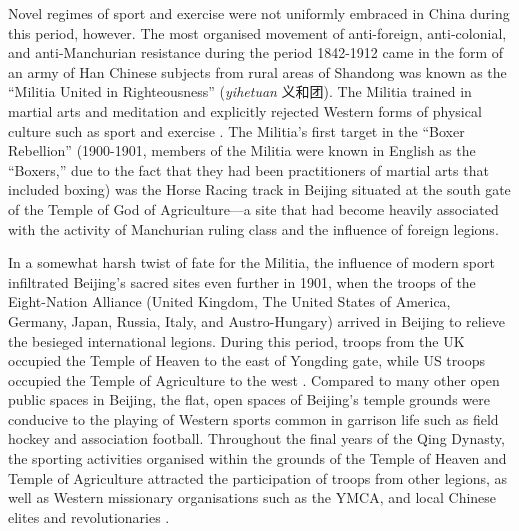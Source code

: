 \begin{CJK}{UTF8}{gbsn}
Novel regimes of sport and exercise were not uniformly embraced in China during this period, however.  The most organised movement of anti-foreign, anti-colonial, and anti-Manchurian resistance during the period 1842-1912 came in the form of an army of Han Chinese subjects from rural areas of Shandong was known as the ``Militia United in Righteousness'' (\textit{yihetuan} 义和团).  The Militia trained in martial arts and meditation and explicitly rejected Western forms of physical culture such as sport and exercise \citep{Brownell2008}.  The Militia's first target in the ``Boxer Rebellion'' (1900-1901, members of the Militia were known in English as the ``Boxers,'' due to the fact that they had been practitioners of martial arts that included boxing) was the Horse Racing track in Beijing situated at the south gate of the Temple of God of Agriculture---a site that had become heavily associated with the activity of Manchurian ruling class and the influence of foreign legions.

In a somewhat harsh twist of fate for the Militia, the influence of modern sport infiltrated Beijing's sacred sites even further in 1901, when the troops of the Eight-Nation Alliance (United Kingdom, The United States of America, Germany, Japan, Russia, Italy, and Austro-Hungary) arrived in Beijing to relieve the besieged international legions.  During this period, troops from the UK occupied the Temple of Heaven to the east of Yongding gate, while US troops occupied the Temple of Agriculture to the west \citep{Brownell2008}. Compared to many other open public spaces in Beijing, the flat, open spaces of Beijing's temple grounds were conducive to the playing of Western sports common in garrison life such as field hockey and association football.  Throughout the final years of the Qing Dynasty, the sporting activities organised within the grounds of the Temple of Heaven and Temple of Agriculture attracted the participation of troops from other legions, as well as Western missionary organisations such as the YMCA, and local Chinese elites and revolutionaries \citep{Steel1985}.


\end{CJK}
